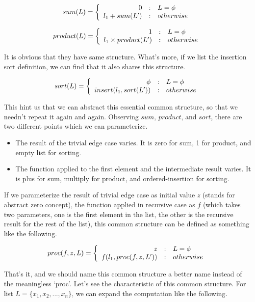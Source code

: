 \documentclass[b5paper]{article}
\begin{document}
\[
sum(L) =  \left \{
  \begin{array}
  {r@{\quad:\quad}l}
  0 & L = \phi \\
  l_1 + sum(L') & otherwise
  \end{array}
\right.
\]

\[
product(L) = \left \{
  \begin{array}
  {r@{\quad:\quad}l}
  1 & L = \phi \\
  l_1 \times product(L') & otherwise
  \end{array}
\right.
\]

It is obvious that they have same structure. What's more, if we list the insertion sort definition, we can
find that it also shares this structure.

\[
sort(L) = \left \{
  \begin{array}
  {r@{\quad:\quad}l}
  \phi & L = \phi \\
  insert(l_1, sort(L')) & otherwise
  \end{array}
\right.
\]

This hint us that we can abstract this essential common structure, so that we needn't repeat it again and again.
Observing $sum$, $product$, and $sort$, there are two different points which we can parameterize.

\begin{itemize}
\item The result of the trivial edge case varies. It is zero for sum, 1 for product, and empty list for sorting.
\item The function applied to the first element and the intermediate result varies. It is plus for sum, multiply for product,
and ordered-insertion for sorting.
\end{itemize}

If we parameterize the result of trivial edge case as initial value $z$ (stands for abstract zero concept), the
function applied in recursive case as $f$ (which takes two parameters, one is the first element in the list,
the other is the recursive result for the rest of the list), this common structure can be defined as something
like the following.

\[
proc(f, z, L) = \left \{
  \begin{array}
  {r@{\quad:\quad}l}
  z & L = \phi \\
  f(l_1, proc(f, z, L')) & otherwise
  \end{array}
\right.
\]

That's it, and we should name this common structure a better name instead of the meaningless `proc'. Let's
see the characteristic of this common structure. For list $L = \{x_1, x_2, ..., x_n \}$, we can expand the
computation like the following.
\end{document}
